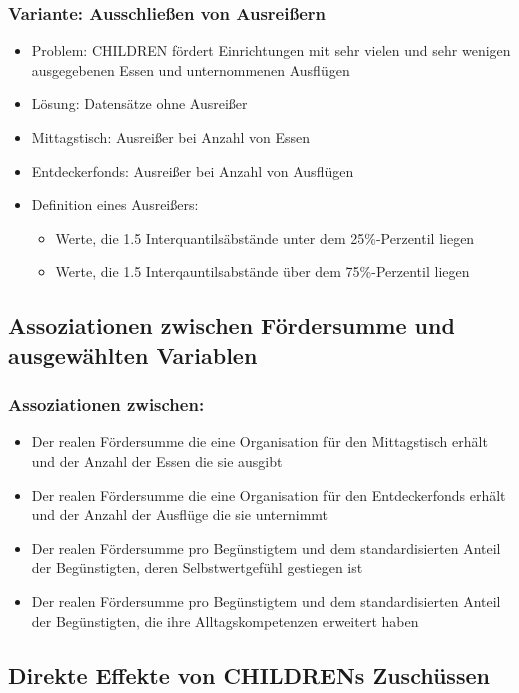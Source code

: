 \begin{frame}[fragile]
\frametitle{Variante: Ausschließen von Ausreißern}
\begin{itemize}
\item Problem: CHILDREN fördert Einrichtungen mit sehr vielen und sehr wenigen ausgegebenen Essen und unternommenen Ausflügen
\item Lösung: Datensätze ohne Ausreißer
\item Mittagstisch: Ausreißer bei Anzahl von Essen
\item Entdeckerfonds: Ausreißer bei Anzahl von Ausflügen
\item Definition eines Ausreißers:
\begin{itemize}
\item Werte, die 1.5 Interquantilsäbstände unter dem 25\%-Perzentil liegen
\item Werte, die 1.5 Interqauntilsabstände über dem 75\%-Perzentil liegen
\end{itemize}
\end{itemize}
\end{frame}

\subsection{Assoziationen zwischen Fördersumme und ausgewählten Variablen}

\begin{frame}[fragile]
\frametitle{Assoziationen zwischen:}
\begin{itemize}
\item Der realen Fördersumme die eine Organisation für den Mittagstisch erhält und der Anzahl der Essen die sie ausgibt
\item Der realen Fördersumme die eine Organisation für den Entdeckerfonds erhält und der Anzahl der Ausflüge die sie unternimmt
\item Der realen Fördersumme pro Begünstigtem und dem standardisierten Anteil der Begünstigten, deren Selbstwertgefühl gestiegen ist
\item Der realen Fördersumme pro Begünstigtem und dem standardisierten Anteil der Begünstigten, die ihre Alltagskompetenzen erweitert haben
\end{itemize}
\end{frame}


\subsection{Direkte Effekte von CHILDRENs Zuschüssen}

